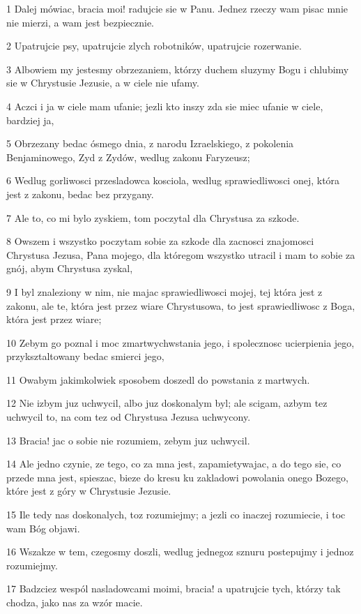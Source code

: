 \par 1 Dalej mówiac, bracia moi! radujcie sie w Panu. Jednez rzeczy wam pisac mnie nie mierzi, a wam jest bezpiecznie.
\par 2 Upatrujcie psy, upatrujcie zlych robotników, upatrujcie rozerwanie.
\par 3 Albowiem my jestesmy obrzezaniem, którzy duchem sluzymy Bogu i chlubimy sie w Chrystusie Jezusie, a w ciele nie ufamy.
\par 4 Aczci i ja w ciele mam ufanie; jezli kto inszy zda sie miec ufanie w ciele, bardziej ja,
\par 5 Obrzezany bedac ósmego dnia, z narodu Izraelskiego, z pokolenia Benjaminowego, Zyd z Zydów, wedlug zakonu Faryzeusz;
\par 6 Wedlug gorliwosci przesladowca kosciola, wedlug sprawiedliwosci onej, która jest z zakonu, bedac bez przygany.
\par 7 Ale to, co mi bylo zyskiem, tom poczytal dla Chrystusa za szkode.
\par 8 Owszem i wszystko poczytam sobie za szkode dla zacnosci znajomosci Chrystusa Jezusa, Pana mojego, dla któregom wszystko utracil i mam to sobie za gnój, abym Chrystusa zyskal,
\par 9 I byl znaleziony w nim, nie majac sprawiedliwosci mojej, tej która jest z zakonu, ale te, która jest przez wiare Chrystusowa, to jest sprawiedliwosc z Boga, która jest przez wiare;
\par 10 Zebym go poznal i moc zmartwychwstania jego, i spolecznosc ucierpienia jego, przyksztaltowany bedac smierci jego,
\par 11 Owabym jakimkolwiek sposobem doszedl do powstania z martwych.
\par 12 Nie izbym juz uchwycil, albo juz doskonalym byl; ale scigam, azbym tez uchwycil to, na com tez od Chrystusa Jezusa uchwycony.
\par 13 Bracia! jac o sobie nie rozumiem, zebym juz uchwycil.
\par 14 Ale jedno czynie, ze tego, co za mna jest, zapamietywajac, a do tego sie, co przede mna jest, spieszac, bieze do kresu ku zakladowi powolania onego Bozego, które jest z góry w Chrystusie Jezusie.
\par 15 Ile tedy nas doskonalych, toz rozumiejmy; a jezli co inaczej rozumiecie, i toc wam Bóg objawi.
\par 16 Wszakze w tem, czegosmy doszli, wedlug jednegoz sznuru postepujmy i jednoz rozumiejmy.
\par 17 Badzciez wespól nasladowcami moimi, bracia! a upatrujcie tych, którzy tak chodza, jako nas za wzór macie.
